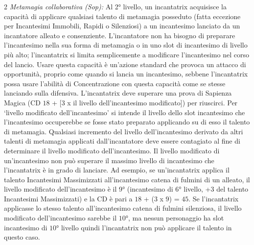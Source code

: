 \documentclass[10pt, a4paper]{report}
\begin{document}
\begin{multicols}{2}
\textit{Metamagia collaborativa (Sop):} Al 2° livello, un incantatrix acquisisce la capacità di applicare qualsiasi talento di metamagia posseduto (fatta eccezione per Incantesimi Immobili, Rapidi o Silenziosi) a un incantesimo lanciato da un incantatore alleato e consenziente. L'incantatore non ha bisogno di preparare l'incantesimo nella sua forma di metamagia o in uno slot di incantesimo di livello più alto; l'incantatrix si limita semplicemente a modificare l'incantesimo nel corso del lancio. Usare questa capacità è un'azione standard che provoca un attacco di opportunità, proprio come quando si lancia un incantesimo, sebbene l'incantatrix possa usare l'abilità di Concentrazione con questa capacità come se stesse lanciando sulla difensiva. L'incantatrix deve superare una prova di Sapienza Magica (CD $18$ + [$3$ x il livello dell'incantesimo modificato]) per riuscirci. Per \enquote*{livello modificato dell'incantesimo} si intende il livello dello slot incantesimo che l'incantesimo occuperebbe se fosse stato preparato applicando su di esso il talento di metamagia. Qualsiasi incremento del livello dell'incantesimo derivato da altri talenti di metamagia applicati dall'incantatore deve essere contagiato al fine di determinare il livello modificato dell'incantesimo. Il livello modificato di un'incantesimo non può superare il massimo livello di incantesimo che l'incantatrix è in grado di lanciare. Ad esempio, se un'incantatrix applica il talento Incantesimi Massimizzati all'incantesimo catena di fulmini di un alleato, il livello modificato dell'incantesimo è il 9° (incantesimo di 6° livello, +3 del talento Incantesimi Massimizzati) e la CD è pari a $18$ + ($3$ x $9$) = $45$. Se l'incantatrix applicasse lo stesso talento all'incantesimo catena di fulmini silenziosa, il livello modificato dell'incantesimo sarebbe il $10$°, ma nessun personaggio ha slot incantesimo di $10$° livello quindi l'incantatrix non può applicare il talento in questo caso.


\end{multicols}
\end{document}
